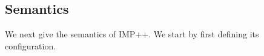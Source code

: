 \documentclass{article}
\begin{document}
\begin{kdefinition}
\begin{module}{}
\begin{syntaxBlock}{}
\end{syntaxBlock}

\begin{syntaxBlock}{}
\end{syntaxBlock}
\end{module}
\begin{module}{}
\begin{kblock}[text]
 \section{Semantics}
We next give the semantics of IMP++\@.  We start by first defining its
configuration. \end{kblock}
\begin{kblock}[text]

\end{kblock}
\end{module}
\end{kdefinition}
\end{document}
